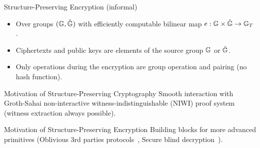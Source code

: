 \begin{frame}
  \begin{block}{Structure-Preserving Encryption (informal)}
    \pause
    \begin{itemize}
    \item Over groups $(\mathbb{G}, \hat{\mathbb{G}})$ with efficiently computable bilinear map $e: \mathbb{G} \times \hat{\mathbb{G}} \to \mathbb{G}_T$.
      \pause
    \item Ciphertexts and public keys are elements of the source group $\mathbb{G}$ or $\hat{\mathbb{G}}$.
      \pause
    \item Only operations during the encryption are group operation and pairing (\eg no hash function).
    \end{itemize}
  \end{block}

  \pause
  
  \begin{block}{Motivation of Structure-Preserving Cryptography}
    Smooth interaction with Groth-Sahai non-interactive witness-indistinguishable (NIWI) proof system (witness extraction always possible).
  \end{block}

  \pause
  
  \begin{block}{Motivation of Structure-Preserving Encryption}
    Building blocks for more advanced primitives (\eg Oblivious 3rd parties protocols~\cite{DBLP:conf/dim/CamenischGH08}, Secure blind decryption~\cite{DBLP:conf/pkc/Green11}).
  \end{block}
\end{frame}


